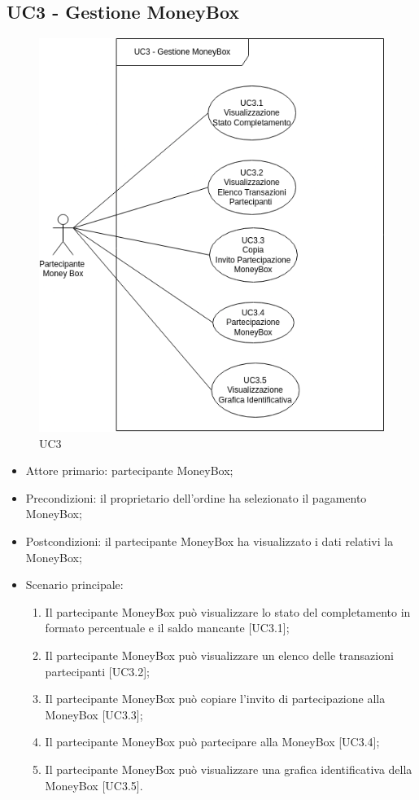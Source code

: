 \subsection{UC3 - Gestione MoneyBox}

\begin{figure}[H]
    \centering
    \includegraphics[scale=0.7]{immagini/UC3.png}
    \caption{UC3}
\end{figure}

\begin{itemize}
    \item Attore primario: partecipante MoneyBox\glo{};
    \item Precondizioni: il proprietario dell'ordine ha selezionato il pagamento MoneyBox\glo [UC2.2.2];
    \item Postcondizioni: il partecipante MoneyBox\glo{} ha visualizzato i dati relativi la MoneyBox\glo{};
    \item Scenario principale:
          \begin{enumerate}
                \item Il partecipante MoneyBox\glo{} può visualizzare lo stato del completamento in formato percentuale e il saldo mancante [UC3.1];
                \item Il partecipante MoneyBox\glo{} può visualizzare un elenco delle transazioni partecipanti [UC3.2];
                \item Il partecipante MoneyBox\glo{} può copiare l'invito di partecipazione alla MoneyBox\glo{} [UC3.3];
                \item Il partecipante MoneyBox\glo{} può partecipare alla MoneyBox\glo{} [UC3.4];
                \item Il partecipante MoneyBox\glo{} può visualizzare una grafica identificativa della MoneyBox\glo{} [UC3.5].
    \end{enumerate}
\end{itemize}

